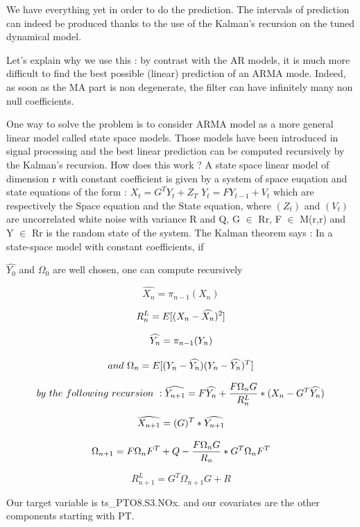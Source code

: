 \documentclass[]{article}
\begin{document}
We have everything yet in order to do the prediction. The intervals of
prediction can indeed be produced thanks to the use of the Kalman's
recursion on the tuned dynamical model.

Let's explain why we use this : by contrast with the AR models, it is
much more difficult to find the best possible (linear) prediction of an
ARMA mode. Indeed, as soon as the MA part is non degenerate, the filter
can have infinitely many non null coefficients.

One way to solve the problem is to consider ARMA model as a more general
linear model called state space models. Those models have been
introduced in signal processing and the best linear prediction can be
computed recursively by the Kalman's recursion. How does this work ? A
state space linear model of dimension r with constant coefficient is
given by a system of space euqation and state equations of the form :
\(X_t = G^TY_t +Z_T\) \(Y_t = FY_{t-1} +V_t\) which are respectively the
Space equation and the State equation, where \((Z_t)\) and \((V_t)\) are
uncorrelated white noise with variance R and Q, G \(\in\) Rr, F \(\in\)
M(r,r) and Y \(\in\) Rr is the random state of the system. The Kalman
theorem says : In a state-space model with constant coefficients, if

\(\widehat{Y_0}\) and \(\Omega_0\) are well chosen, one can compute
recursively

\[ 
\widehat{X_n} = \pi_{n-1}(X_n)
\]

\[\\ R_n^L = E[(X_n - \widehat{X_n})^2] \]

\[\\ \widehat{Y_n} = \pi_{n-1}(Y_n) \]

\[\\and\ \Omega_n = E[(Y_n - \widehat{Y_n})(Y_n - \widehat{Y_n})^T] \]

\[\\by\ the\ following\ recursion\ : \\
\widehat{Y_{n+1}} = F\widehat{Y_n} + \frac{F\Omega_nG}{R_n^L}*(X_n -G^T\widehat{Y_n}) \\\]

\[\widehat{X_{n+1}} = (G)^T*\widehat{Y_{n+1}} \\\]

\[\Omega_{n+1} = F\Omega_nF^T +Q- \frac{F\Omega_nG}{R_n}*G^T\Omega_nF^T \\\]

\[
R_{n+1}^L = G^T\Omega_{n+1}G+R 
\]

Our target variable is ts\_PTO8.S3.NOx. and our covariates are the other
components starting with PT.
\end{document}
